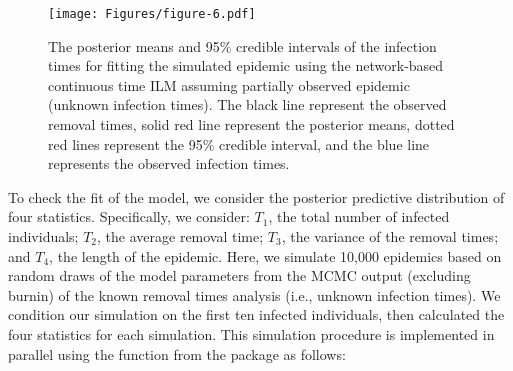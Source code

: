 \documentclass[nojss,shortnames]{jss}
\begin{document}
\begin{figure}[!h]
\begin{center}
\texttt{[image: Figures/figure-6.pdf]}
\caption{The posterior means and 95$\%$ credible intervals of the infection times for fitting the simulated epidemic using the network-based continuous time ILM assuming partially observed epidemic (unknown infection times). The black line represent the observed removal times, solid red line represent the posterior means, dotted red lines represent the 95\% credible interval, and the blue line represents the observed infection times.}
\label{fig.network-mcmc-2-epi-curve}
\end{center}
\end{figure}

To check the fit of the model, we consider the posterior predictive distribution of four statistics. Specifically, we consider: $T_{1}$, the total number of infected individuals; $T_{2}$, the average removal time; $T_{3}$, the variance of the removal times; and $T_{4}$, the length of the epidemic. Here, we simulate 10,000 epidemics based on random draws of the model parameters from the MCMC output (excluding burnin) of the known removal times analysis (i.e., unknown infection times). We condition our simulation on the first ten infected individuals, then calculated the four statistics for each simulation. This simulation procedure is implemented in parallel using the  function from the  package \citep{future.apply} as follows:

\end{document}
